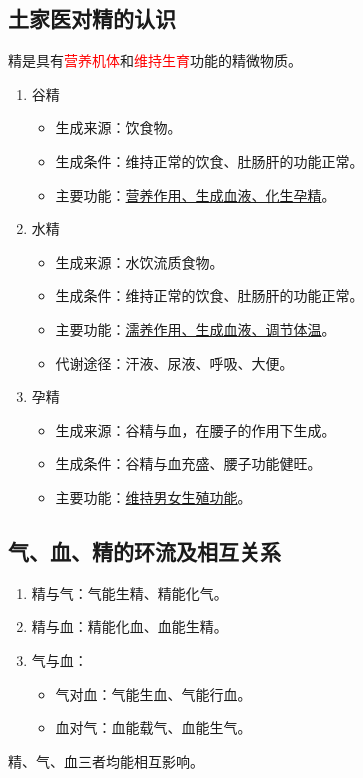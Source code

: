 \documentclass[cn,blue,12pt,normal,founder]{elegantnote}
\newcommand{\redt}[1]{\textcolor{red}{{}#1}}      %
\begin{document}
\subsection{土家医对精的认识}

精是具有\redt{营养机体}和\redt{维持生育}功能的精微物质。

\begin{enumerate}
  \item 谷精
  \begin{itemize}
    \item 生成来源：饮食物。
    \item 生成条件：维持正常的饮食、肚肠肝的功能正常。
    \item 主要功能：\uline{营养作用、生成血液、化生孕精}。
  \end{itemize}
  \item 水精
  \begin{itemize}
    \item 生成来源：水饮流质食物。
    \item 生成条件：维持正常的饮食、肚肠肝的功能正常。
    \item 主要功能：\uline{濡养作用、生成血液、调节体温}。
    \item 代谢途径：汗液、尿液、呼吸、大便。
  \end{itemize}
  \item 孕精
  \begin{itemize}
    \item 生成来源：谷精与血，在腰子的作用下生成。
    \item 生成条件：谷精与血充盛、腰子功能健旺。
    \item 主要功能：\uline{维持男女生殖功能}。
  \end{itemize}
\end{enumerate}

\subsection{气、血、精的环流及相互关系}

\begin{enumerate}
  \item 精与气：气能生精、精能化气。
  \item 精与血：精能化血、血能生精。
  \item 气与血：
  \begin{itemize}
    \item 气对血：气能生血、气能行血。
    \item 血对气：血能载气、血能生气。
  \end{itemize}
\end{enumerate}
\begin{note}
  精、气、血三者均能相互影响。
\end{note}
\end{document}

